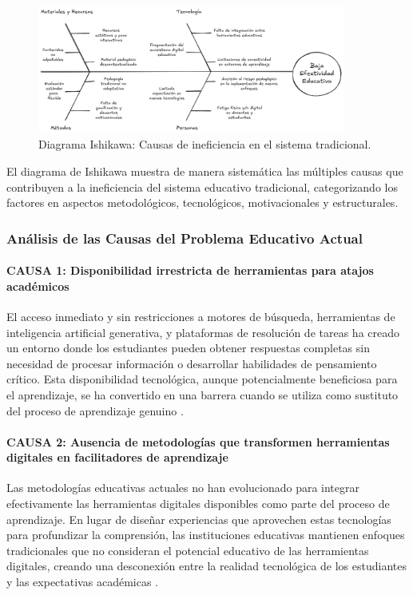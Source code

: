 \begin{figure}[H]
	\centering
	\includegraphics[width=0.9\textwidth]{images/diagrama_de_ishikawa.png}
	\caption{Diagrama Ishikawa: Causas de ineficiencia en el sistema tradicional.}
	\label{fig:ishikawa}
\end{figure}

El diagrama de Ishikawa muestra de manera sistemática las múltiples causas que contribuyen a la ineficiencia del sistema educativo tradicional, categorizando los factores en aspectos metodológicos, tecnológicos, motivacionales y estructurales.

\subsubsection{Análisis de las Causas del Problema Educativo Actual}

\paragraph{CAUSA 1: Disponibilidad irrestricta de herramientas para atajos académicos}
El acceso inmediato y sin restricciones a motores de búsqueda, herramientas de inteligencia artificial generativa, y plataformas de resolución de tareas ha creado un entorno donde los estudiantes pueden obtener respuestas completas sin necesidad de procesar información o desarrollar habilidades de pensamiento crítico. Esta disponibilidad tecnológica, aunque potencialmente beneficiosa para el aprendizaje, se ha convertido en una barrera cuando se utiliza como sustituto del proceso de aprendizaje genuino \cite{saputra2025}.

\paragraph{CAUSA 2: Ausencia de metodologías que transformen herramientas digitales en facilitadores de aprendizaje}
Las metodologías educativas actuales no han evolucionado para integrar efectivamente las herramientas digitales disponibles como parte del proceso de aprendizaje. En lugar de diseñar experiencias que aprovechen estas tecnologías para profundizar la comprensión, las instituciones educativas mantienen enfoques tradicionales que no consideran el potencial educativo de las herramientas digitales, creando una desconexión entre la realidad tecnológica de los estudiantes y las expectativas académicas \cite{nurhayati2025}.

